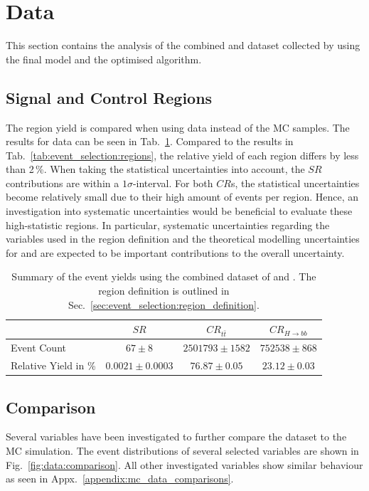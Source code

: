 \documentclass[bachelor,ngerman,english]{GAUBM}
\begin{document}
\section{Data}
\label{results:data}
This section contains the analysis of the combined \runi and \runii{} dataset collected by \atlas using the final \spanet model and the optimised \NW algorithm.

\subsection*{Signal and Control Regions}
The region yield is compared when using data instead of the MC samples. The results for data can be seen in Tab.~\ref{tab:data:regions}. Compared to the results in Tab.~\ref{tab:event_selection:regions}, the relative yield of each region differs by less than 2\,\%. When taking the statistical uncertainties into account, the $SR$ contributions are within a $1\sigma$-interval. For both $CR$s, the statistical uncertainties become relatively small due to their high amount of events per region. Hence, an investigation into systematic uncertainties would be beneficial to evaluate these high-statistic regions. In particular, systematic uncertainties regarding the variables used in the region definition and the theoretical modelling uncertainties for \ttbar and \ttHbb are expected to be important contributions to the overall uncertainty.

\begin{table}
    \centering
    \caption{Summary of the event yields using the combined \atlas dataset of \runi and \runii. The region definition is outlined in Sec.~\ref{sec:event_selection:region_definition}.}
    \begin{tabular}{l|c|c|c}
        & $SR$ & $CR_{t\bar{t}}$ & $CR_{H\rightarrow bb}$ \\
        \hline
        Event Count & $67\pm8$ & $2501793\pm1582$ & $752538\pm868$\\
        Relative Yield in \%& $0.0021\pm0.0003$ & $76.87\pm0.05$ & $23.12\pm0.03$\\
    \end{tabular}
    \label{tab:data:regions}
\end{table}


\subsection*{Comparison}
Several variables have been investigated to further compare the \atlas dataset to the MC simulation. The event distributions of several selected variables are shown in Fig.~\ref{fig:data:comparison}. All other investigated variables show similar behaviour as seen in Appx.~\ref{appendix:mc_data_comparisons}.
\end{document}
